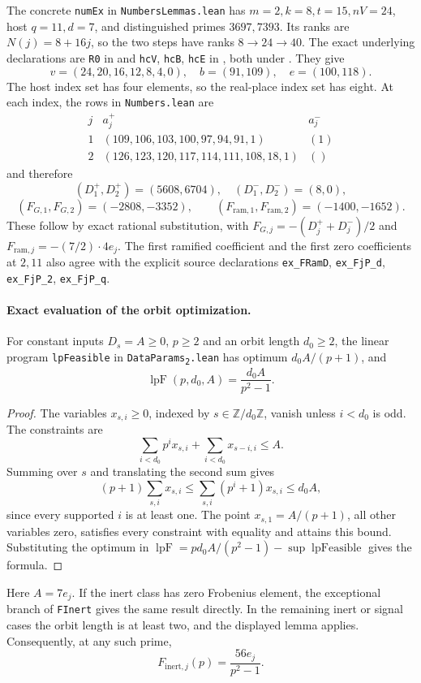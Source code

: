 \documentclass[11pt,a4paper]{article}
\theoremstyle{remark}
\begin{document}
The concrete \texttt{numEx} in \texttt{NumbersLemmas.lean} has
$m=2,k=8,t=15,nV=24$, host $q=11,d=7$, and distinguished primes
$3697,7393$.  Its ranks are $N(j)=8+16j$, so the two steps have ranks
$8\to24\to40$.  The exact underlying declarations are
\texttt{R0} in 
and \texttt{hcV}, \texttt{hcB}, \texttt{hcE} in
, both under
.  They give
\[
 v=(24,20,16,12,8,4,0),\quad b=(91,109),\quad e=(100,118).
\]
The host index set has four elements, so the real-place index set has
eight.  At each index, the rows in \texttt{Numbers.lean} are
\[
\begin{array}{c|l|l}
j&a^+_j&a^-_j\\ \hline
1&(109,106,103,100,97,94,91,1)&(1)\\
2&(126,123,120,117,114,111,108,18,1)&()
\end{array}
\]
and therefore
\[
 (D^+_1,D^+_2)=(5608,6704),\quad
 (D^-_1,D^-_2)=(8,0),
\]
\[
 (F_{G,1},F_{G,2})=(-2808,-3352),\qquad
 (F_{\mathrm{ram},1},F_{\mathrm{ram},2})=(-1400,-1652).
\]
These follow by exact rational substitution, with
$F_{G,j}=-(D^+_j+D^-_j)/2$ and
$F_{\mathrm{ram},j}=-(7/2)\cdot4e_j$.
The first ramified coefficient and the first zero coefficients at $2,11$
also agree with the explicit source declarations
\texttt{ex\_FRamD}, \texttt{ex\_FjP\_d},
\texttt{ex\_FjP\_2}, \texttt{ex\_FjP\_q}.

\paragraph{Exact evaluation of the orbit optimization.}
For constant inputs $D_s=A\ge0$, $p\ge2$ and an orbit length
$d_0\ge2$, the linear program \texttt{lpFeasible} in
\texttt{DataParams\textsubscript{2}.lean} has optimum
$d_0A/(p+1)$, and
\[
 \operatorname{lpF}(p,d_0,A)=\frac{d_0A}{p^2-1}.
\]
\begin{proof}
The variables $x_{s,i}\ge0$, indexed by $s\in\mathbb Z/d_0\mathbb Z$,
vanish unless $i<d_0$ is odd.  The constraints are
\[
 \sum_{i<d_0}p^i x_{s,i}+\sum_{i<d_0}x_{s-i,i}\le A.
\]
Summing over $s$ and translating the second sum gives
\[
 (p+1)\sum_{s,i}x_{s,i}
 \le\sum_{s,i}(p^i+1)x_{s,i}\le d_0A,
\]
since every supported $i$ is at least one.  The point
$x_{s,1}=A/(p+1)$, all other variables zero, satisfies every constraint
with equality and attains this bound.  Substituting the optimum in
$\operatorname{lpF}=p d_0A/(p^2-1)-\sup\operatorname{lpFeasible}$
gives the formula.
\end{proof}
Here $A=7e_j$.  If the inert class has zero Frobenius element, the
exceptional branch of \texttt{FInert} gives the same result directly.
In the remaining inert or signal cases the orbit length is at least two,
and the displayed lemma applies.  Consequently, at any such prime,
\[
 F_{\mathrm{inert},j}(p)=\frac{56e_j}{p^2-1}.
\]
\end{document}
